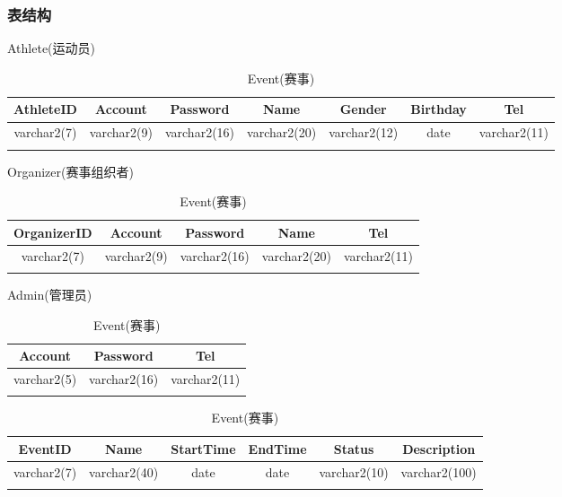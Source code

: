 \documentclass[a4paper,UTF8]{article}
\begin{document}
\subsubsection{表结构}
\begin{table}[H]
	\centering
	\caption{Athlete(运动员)}
	\label{table:Tab_db_athlete}
	\begin{tabular}{|c|c|c|c|c|c|c|}
		\hline\noalign{\smallskip}
		AthleteID & Account & Password & Name & Gender & Birthday & Tel\\
		\hline
		varchar2(7) & varchar2(9) & varchar2(16) & varchar2(20) & varchar2(12) & date & varchar2(11)\\
		\noalign{\smallskip}
		\hline
		\noalign{\smallskip}
	\end{tabular}

	\caption{Organizer(赛事组织者)}
	\label{table:Tab_db_organizer}
	\begin{tabular}{|c|c|c|c|c|}
		\hline\noalign{\smallskip}
		OrganizerID & Account & Password & Name & Tel\\
		\hline
		varchar2(7) & varchar2(9) & varchar2(16) & varchar2(20) & varchar2(11)\\
		\noalign{\smallskip}
		\hline
		\noalign{\smallskip}
	\end{tabular}

	\caption{Admin(管理员)}
	\label{table:Tab_db_admin}
	\begin{tabular}{|c|c|c|}
		\hline\noalign{\smallskip}
		Account & Password & Tel\\
		\hline
		varchar2(5) & varchar2(16) & varchar2(11)\\
		\noalign{\smallskip}
		\hline
		\noalign{\smallskip}
	\end{tabular}

	\caption{Event(赛事)}
	\label{table:Tab_db_event}
	\begin{tabular}{|c|c|c|c|c|c|}
		\hline\noalign{\smallskip}
		EventID & Name & StartTime & EndTime & Status & Description\\
		\hline
		varchar2(7) & varchar2(40) & date & date & varchar2(10) & varchar2(100)\\
		\noalign{\smallskip}
		\hline
		\noalign{\smallskip}
	\end{tabular}
\end{table}
\end{document}
